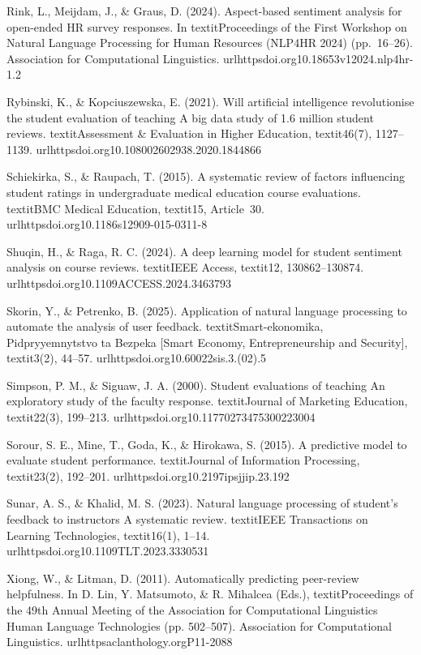 Rink, L., Meijdam, J., & Graus, D. (2024). Aspect-based sentiment analysis for open-ended HR survey responses. In textit{Proceedings of the First Workshop on Natural Language Processing for Human Resources (NLP4HR 2024)} (pp.~16--26). Association for Computational Linguistics. url{httpsdoi.org10.18653v12024.nlp4hr-1.2}

Rybinski, K., & Kopciuszewska, E. (2021). Will artificial intelligence revolutionise the student evaluation of teaching A big data study of 1.6 million student reviews. textit{Assessment & Evaluation in Higher Education}, textit{46}(7), 1127--1139. url{httpsdoi.org10.108002602938.2020.1844866}

Schiekirka, S., & Raupach, T. (2015). A systematic review of factors influencing student ratings in undergraduate medical education course evaluations. textit{BMC Medical Education}, textit{15}, Article~30. url{httpsdoi.org10.1186s12909-015-0311-8}

Shuqin, H., & Raga, R. C. (2024). A deep learning model for student sentiment analysis on course reviews. textit{IEEE Access}, textit{12}, 130862--130874. url{httpsdoi.org10.1109ACCESS.2024.3463793}

Skorin, Y., & Petrenko, B. (2025). Application of natural language processing to automate the analysis of user feedback. textit{Smart-ekonomika, Pidpryyemnytstvo ta Bezpeka [Smart Economy, Entrepreneurship and Security]}, textit{3}(2), 44--57. url{httpsdoi.org10.60022sis.3.(02).5}

Simpson, P. M., & Siguaw, J. A. (2000). Student evaluations of teaching An exploratory study of the faculty response. textit{Journal of Marketing Education}, textit{22}(3), 199--213. url{httpsdoi.org10.11770273475300223004}

Sorour, S. E., Mine, T., Goda, K., & Hirokawa, S. (2015). A predictive model to evaluate student performance. textit{Journal of Information Processing}, textit{23}(2), 192--201. url{httpsdoi.org10.2197ipsjjip.23.192}


Sunar, A. S., & Khalid, M. S. (2023). Natural language processing of student’s feedback to instructors A systematic review. textit{IEEE Transactions on Learning Technologies}, textit{16}(1), 1--14. url{httpsdoi.org10.1109TLT.2023.3330531} 

Xiong, W., & Litman, D. (2011). Automatically predicting peer-review helpfulness. In D. Lin, Y. Matsumoto, & R. Mihalcea (Eds.), textit{Proceedings of the 49th Annual Meeting of the Association for Computational Linguistics Human Language Technologies} (pp. 502--507). Association for Computational Linguistics. url{httpsaclanthology.orgP11-2088}

